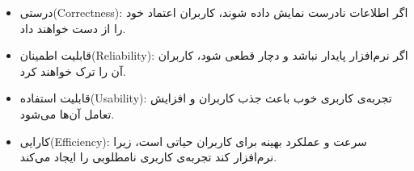 \begin{itemize}
    \item {درستی(Correctness)}: اگر اطلاعات نادرست نمایش داده شوند، کاربران اعتماد خود را از دست خواهند داد.
    \item {قابلیت اطمینان(Reliability)}: اگر نرم‌افزار پایدار نباشد و دچار قطعی شود، کاربران آن را ترک خواهند کرد.
    \item {قابلیت استفاده(Usability)}: تجربه‌ی کاربری خوب باعث جذب کاربران و افزایش تعامل آن‌ها می‌شود.
    \item {کارایی(Efficiency)}: سرعت و عملکرد بهینه برای کاربران حیاتی است، زیرا نرم‌افزار کند تجربه‌ی کاربری نامطلوبی را ایجاد می‌کند.
\end{itemize}

